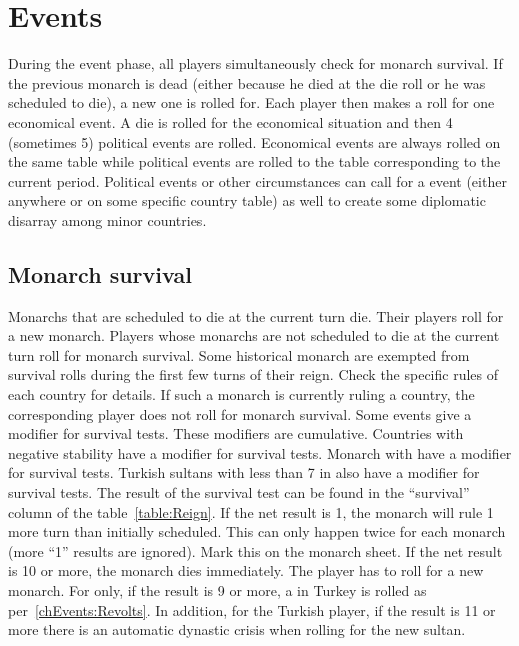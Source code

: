 
\chapter{Events}\label{chapter:Events}


\aparag[Overview.] During the event phase, all players simultaneously
check for monarch survival. If the previous monarch is dead (either
because he died at the die roll or he was scheduled to die), a new one
is rolled for. Each player then makes a roll for one economical event. A
die is rolled for the economical situation and then 4 (sometimes 5)
political events are rolled.
\bparag Economical events are always rolled on the same table while
political events are rolled to the table corresponding to the current
period.
\bparag Political events or other circumstances can call for a \REVOLT
event (either anywhere or on some specific country table) as well to
create some diplomatic disarray among minor countries.

\aparag[Sequence.]
\EventsDetails




\section{Monarch survival}\label{chEvents:Survival}

\aparag Monarchs that are scheduled to die at the current turn
die. Their players roll for a new monarch.
\aparag Players whose monarchs are not scheduled to die at the current
turn roll for monarch survival.
\bparag Some historical monarch are exempted from survival rolls during
the first few turns of their reign. Check the specific rules of each
country for details. If such a monarch is currently ruling a country,
the corresponding player does not roll for monarch survival.
\aparag Some events give a modifier for survival tests. These modifiers
are cumulative.
\bparag Countries with negative stability have a  modifier for
survival tests.
\bparag Monarch with  have a  modifier
for survival tests.
\bparag Turkish sultans with less than 7 in \MIL also have a 
modifier for survival tests.
\aparag The result of the survival test can be found in the ``survival''
column of the table~\ref{table:Reign}.
\bparag If the net result is 1, the monarch will rule 1 more turn than
initially scheduled. This can only happen twice for each monarch (more
``1'' results are ignored). Mark this on the monarch sheet.
\bparag If the net result is 10 or more, the monarch dies immediately.
The player has to roll for a new monarch.
\aparag \label{chEvents:Survival:TUR revolt}For \TUR only, if the result
is 9 or more, a \REVOLT in Turkey is rolled as
per~\ref{chEvents:Revolts}.
\bparag In addition, for the Turkish player, if the result is 11 or more
there is an automatic dynastic crisis when rolling for the new sultan.

